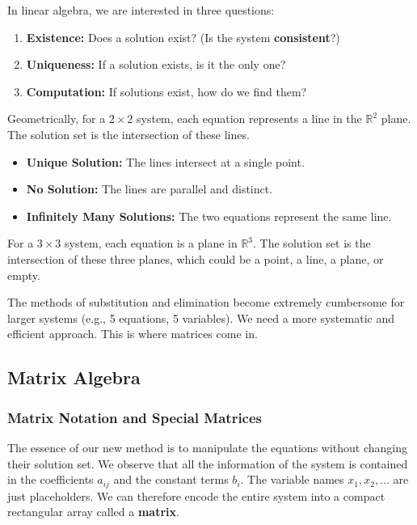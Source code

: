 In linear algebra, we are interested in three questions:
\begin{enumerate}
    \item \textbf{Existence:} Does a solution exist? (Is the system \textbf{consistent}?)
    \item \textbf{Uniqueness:} If a solution exists, is it the only one?
    \item \textbf{Computation:} If solutions exist, how do we find them?
\end{enumerate}

Geometrically, for a $2\times 2$ system, each equation represents a line in the $\mathbb{R}^2$ plane. The solution set is the intersection of these lines.
\begin{itemize}
    \item \textbf{Unique Solution:} The lines intersect at a single point.
    \item \textbf{No Solution:} The lines are parallel and distinct.
    \item \textbf{Infinitely Many Solutions:} The two equations represent the same line.
\end{itemize}
% 

For a $3\times 3$ system, each equation is a plane in $\mathbb{R}^3$. The solution set is the intersection of these three planes, which could be a point, a line, a plane, or empty.
% 

The methods of substitution and elimination become extremely cumbersome for larger systems (e.g., 5 equations, 5 variables). We need a more systematic and efficient approach. This is where matrices come in.

\subsection{Matrix Algebra}

\subsubsection{Matrix Notation and Special Matrices}

The essence of our new method is to manipulate the equations without changing their solution set. We observe that all the information of the system is contained in the coefficients $a_{ij}$ and the constant terms $b_i$. The variable names $x_1, x_2, \ldots$ are just placeholders. We can therefore encode the entire system into a compact rectangular array called a \textbf{matrix}.

